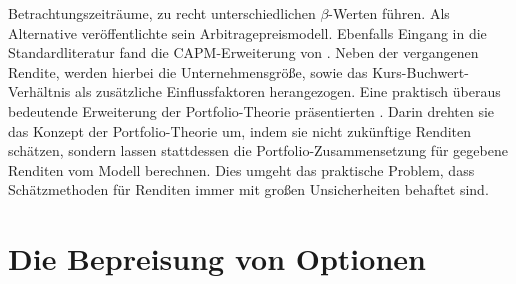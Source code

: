 Betrachtungszeiträume, zu recht unterschiedlichen $\beta$-Werten führen. Als Alternative veröffentlichte \textcite{Ross1976} sein Arbitragepreismodell. Ebenfalls Eingang in die Standardliteratur fand die CAPM-Erweiterung von \textcite{Fama1993}. Neben der vergangenen Rendite, werden hierbei die Unternehmensgröße, sowie das Kurs-Buchwert-Verhältnis als zusätzliche Einflussfaktoren herangezogen. Eine praktisch überaus bedeutende Erweiterung der Portfolio-Theorie präsentierten \textcite{Black1992}. Darin drehten sie das Konzept der Portfolio-Theorie um, indem sie nicht zukünftige Renditen schätzen, sondern lassen stattdessen die Portfolio-Zusammensetzung für gegebene Renditen vom Modell berechnen. Dies umgeht das praktische Problem, dass Schätzmethoden für Renditen immer mit großen Unsicherheiten behaftet sind.

\section{Die Bepreisung von Optionen}
\label{Optionen}

